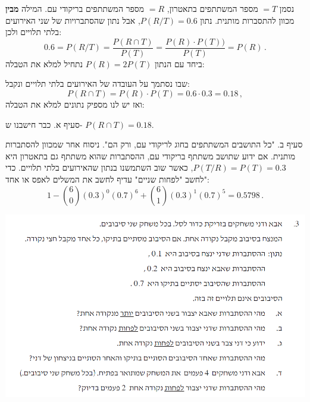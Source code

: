 \documentclass[12pt,a4paper]{article}
\newcommand{\bover}[1]{\bm{\overline{#1}}}
\begin{document}
נסמן
$=T$
מספר המשתתפים בתאטרון,
$=R$
מספר המשתתפים בריקודי עם. המילה 
\textbf{מבין}
מכוון להתסברות מותנית. נתון
$P(R/T)=0.6$,
אבל נתון שהסתברויות של שני האירועים בלתי תלויים ולכן:
\[
0.6=P(R/T)=\frac{P(R\cap T)}{P(T)}=\frac{P(R)\cdot P(T))}{P(T)}=P(R)\,.
\]
ביחד עם הנתון
$P(R)=2P(T)$
נתחיל למלא את הטבלה:
\begin{center}
\end{center}
שבו נסתמך על העובדה של האירועים בלתי תלויים ונקבל:
\[
P(R\cap T)=P(R)\cdot P(T)=0.6\cdot 0.3=0.18\,,
\]
ואז יש לנו מספיק נתונים למלא את הטבלה:
\begin{center}
\end{center}
סעיף א. כבר חישבנו ש-%
$P(R\cap T)=0.18$.

סעיף ב. "כל התושבים המשתתפים בחוג לריקודי עם, ורק הם". ניסוח אחר שמכוון להסתברות מותנית. אם ידוע שתושב משתתף בריקודי עם, ההסתברות שהוא משתתף גם בתאטרון היא
$P(T/R) = P(T) = 0.3$,
כאשר שוב השתמשנו בנתון שהאירועים בלתי תלויים. כדי לחשב "לפחות שניים" עדיף לחשב את המשלים לאפס או אחד":
\[
1-{6\choose 0}(0.3)^0(0.7)^6 +{6\choose 1}(0.3)^1(0.7)^5=0.5798\,.
\]



\textbf{}

\begin{center}
\includegraphics[width=.9\textwidth]{summer-2014a-3}
\end{center}
\end{document}
